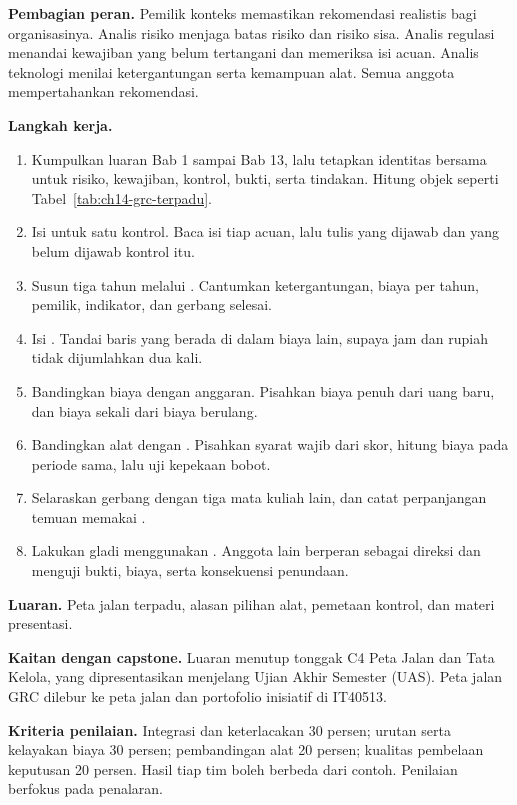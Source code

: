 \textbf{Pembagian peran.} Pemilik konteks memastikan rekomendasi realistis bagi organisasinya.
Analis risiko menjaga batas risiko dan risiko sisa. Analis regulasi menandai kewajiban yang belum
tertangani dan memeriksa isi acuan. Analis teknologi menilai ketergantungan serta kemampuan alat.
Semua anggota mempertahankan rekomendasi.

\textbf{Langkah kerja.}
\begin{enumerate}
  \item Kumpulkan luaran Bab 1 sampai Bab 13, lalu tetapkan identitas bersama untuk risiko,
  kewajiban, kontrol, bukti, serta tindakan. Hitung objek seperti
  Tabel~\ref{tab:ch14-grc-terpadu}.
  \item Isi  untuk satu kontrol. Baca isi tiap
  acuan, lalu tulis yang dijawab dan yang belum dijawab kontrol itu.
  \item Susun tiga tahun melalui . Cantumkan
  ketergantungan, biaya per tahun, pemilik, indikator, dan gerbang selesai.
  \item Isi . Tandai baris yang berada di dalam
  biaya lain, supaya jam dan rupiah tidak dijumlahkan dua kali.
  \item Bandingkan biaya dengan anggaran. Pisahkan biaya penuh dari uang baru, dan biaya sekali
  dari biaya berulang.
  \item Bandingkan alat dengan . Pisahkan syarat
  wajib dari skor, hitung biaya pada periode sama, lalu uji kepekaan bobot.
  \item Selaraskan gerbang dengan tiga mata kuliah lain, dan catat perpanjangan temuan memakai
  .
  \item Lakukan gladi menggunakan . Anggota lain
  berperan sebagai direksi dan menguji bukti, biaya, serta konsekuensi penundaan.
\end{enumerate}

\textbf{Luaran.} Peta jalan terpadu, alasan pilihan alat, pemetaan kontrol, dan materi presentasi.

\textbf{Kaitan dengan capstone.} Luaran menutup tonggak C4 Peta Jalan dan Tata Kelola, yang
dipresentasikan menjelang Ujian Akhir Semester (UAS). Peta jalan GRC dilebur ke peta jalan dan
portofolio inisiatif di IT40513.

\textbf{Kriteria penilaian.} Integrasi dan keterlacakan 30 persen; urutan serta kelayakan biaya 30
persen; pembandingan alat 20 persen; kualitas pembelaan keputusan 20 persen. Hasil tiap tim boleh
berbeda dari contoh. Penilaian berfokus pada penalaran.

